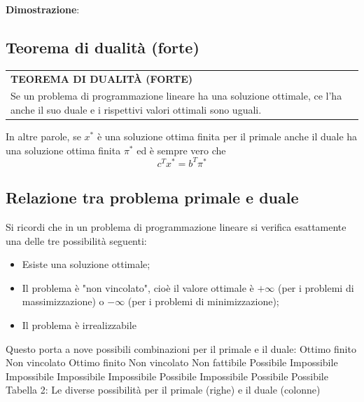 \documentclass[a4paper]{extarticle}
\renewcommand\arraystretch{}
\begin{document}
\vspace{2em}
\noindent
\textbf{Dimostrazione}: %

\vspace{1em}
\noindent
\subsection{Teorema di dualità (forte)}

\vspace{1em}
\setlength{\tabcolsep}{14pt}
\renewcommand{\arraystretch}{2}
\noindent
\begin{tabularx}{\textwidth}{@{}|P|@{}}
    \hline
    {\textbf{TEOREMA DI DUALITÀ (FORTE)}}\\
    \parbox{\linewidth}{Se un problema di programmazione lineare ha una soluzione ottimale, ce l'ha anche il suo duale e i rispettivi valori ottimali sono uguali.\vspace{3mm}}\\
    \hline
\end{tabularx}

\vspace{2em}
\noindent
In altre parole, se $x^*$ è una soluzione ottima finita per il primale anche il duale ha una soluzione ottima finita $\pi^*$ ed è sempre vero che
\[c^Tx^* = b^T\pi^*\]

\vspace{1em}
\noindent
\subsection{Relazione tra problema primale e duale}
Si ricordi che in un problema di programmazione lineare si verifica esattamente una delle tre possibilità seguenti:
\begin{itemize}
    \item Esiste una soluzione ottimale;
    \item Il problema è "non vincolato", cioè il valore ottimale è $+\infty$ (per i problemi di massimizzazione) o $-\infty$ (per i problemi di minimizzazione);
    \item Il problema è irrealizzabile
\end{itemize}

Questo porta a nove possibili combinazioni per il primale e il duale:
Ottimo finito
Non vincolato
Ottimo finito Non vincolato Non fattibile
Possibile
Impossibile Impossibile
Impossibile Impossibile Possibile
Impossibile
Possibile Possibile
Tabella 2: Le diverse possibilità per il primale (righe) e il duale (colonne)
\end{document}
